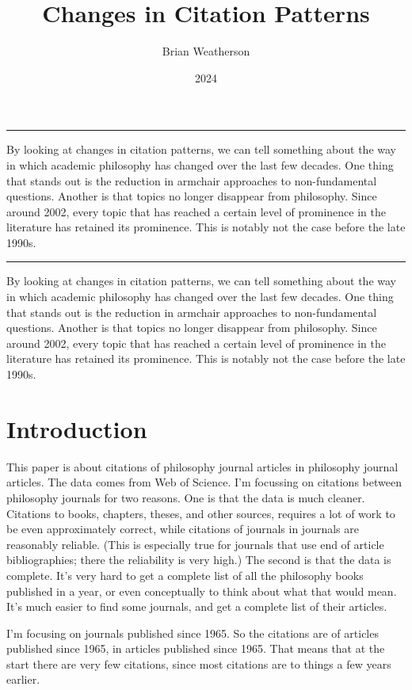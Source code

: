\documentclass[
  10pt,
  letterpaper,
  DIV=11,
  numbers=noendperiod,
  twoside]{scrartcl}
\title{Changes in Citation Patterns}
\author{Brian Weatherson}
\date{2024}
\renewenvironment{abstract}
 {\vspace{-1.25cm}
 \quotation\small\noindent\rule{\linewidth}{.5pt}\par\smallskip
 \noindent }
 {\par\noindent\rule{\linewidth}{.5pt}\endquotation}
\begin{document}
\maketitle
\begin{abstract}
By looking at changes in citation patterns, we can tell something about
the way in which academic philosophy has changed over the last few
decades. One thing that stands out is the reduction in armchair
approaches to non-fundamental questions. Another is that topics no
longer disappear from philosophy. Since around 2002, every topic that
has reached a certain level of prominence in the literature has retained
its prominence. This is notably not the case before the late 1990s.
\end{abstract}

By looking at changes in citation patterns, we can tell something about
the way in which academic philosophy has changed over the last few
decades. One thing that stands out is the reduction in armchair
approaches to non-fundamental questions. Another is that topics no
longer disappear from philosophy. Since around 2002, every topic that
has reached a certain level of prominence in the literature has retained
its prominence. This is notably not the case before the late 1990s.

\section{Introduction}\label{sec-introduction}

This paper is about citations of philosophy journal articles in
philosophy journal articles. The data comes from Web of Science. I'm
focussing on citations between philosophy journals for two reasons. One
is that the data is much cleaner. Citations to books, chapters, theses,
and other sources, requires a lot of work to be even approximately
correct, while citations of journals in journals are reasonably
reliable. (This is especially true for journals that use end of article
bibliographies; there the reliability is very high.) The second is that
the data is complete. It's very hard to get a complete list of all the
philosophy books published in a year, or even conceptually to think
about what that would mean. It's much easier to find some journals, and
get a complete list of their articles.

I'm focusing on journals published since 1965. So the citations are of
articles published since 1965, in articles published since 1965. That
means that at the start there are very few citations, since most
citations are to things a few years earlier.
\end{document}
